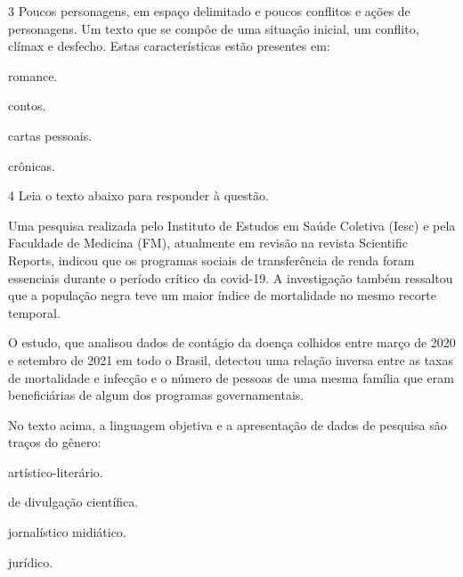 \pagebreak

\num{3} Poucos personagens, em espaço
delimitado e poucos conflitos e ações de personagens. Um texto que se
compõe de uma situação inicial, um conflito, clímax e desfecho. Estas
características estão presentes em:

\begin{escolha}

    \item romance.

    \item contos.

    \item cartas pessoais.

    \item crônicas. 

\end{escolha}

\num{4} Leia o texto abaixo para responder à questão.

\begin{myquote}

Uma pesquisa realizada pelo Instituto de Estudos em Saúde Coletiva
(Iesc) e pela Faculdade de Medicina (FM), atualmente em revisão na
revista Scientific Reports, indicou que os programas sociais de
transferência de renda foram essenciais durante o período crítico da
covid-19. A investigação também ressaltou que a população negra teve um
maior índice de mortalidade no mesmo recorte temporal.

O estudo, que analisou dados de contágio da doença colhidos entre março
de 2020 e setembro de 2021 em todo o Brasil, detectou uma relação
inversa entre as taxas de mortalidade e infecção e o número de pessoas
de uma mesma família que eram beneficiárias de algum dos programas
governamentais.


\end{myquote}

No texto acima, a linguagem objetiva e a apresentação de dados de pesquisa são traços do 
gênero:

\begin{escolha}

    \item artístico-literário.

    \item de divulgação científica.

    \item jornalístico midiático.

    \item jurídico.

\end{escolha}

